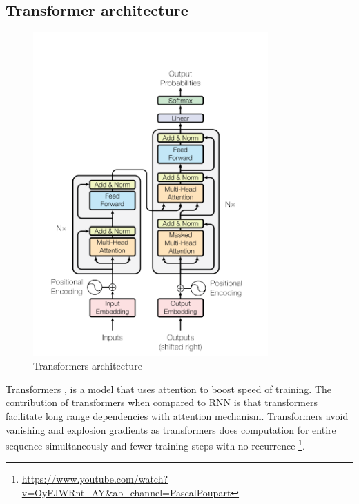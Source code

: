 \subsection{Transformer architecture}
\begin{figure}[]
         \includegraphics[width=9cm]{thesis/figures/Transformers.PNG}
            \centering
            \caption{Transformers architecture  \cite{vaswani2017attention}}
            \label{fig:Transformers}
\end{figure}

Transformers \cite{vaswani2017attention}, is a model that uses attention to boost speed of training. The contribution of transformers when compared to RNN is that transformers facilitate long range dependencies with attention mechanism. Transformers avoid vanishing and explosion gradients as transformers does computation for entire sequence simultaneously and fewer training steps with no recurrence \footnote{\url{https://www.youtube.com/watch?v=OyFJWRnt_AY&ab_channel=PascalPoupart}}\cite{vaswani2017attention}.  

